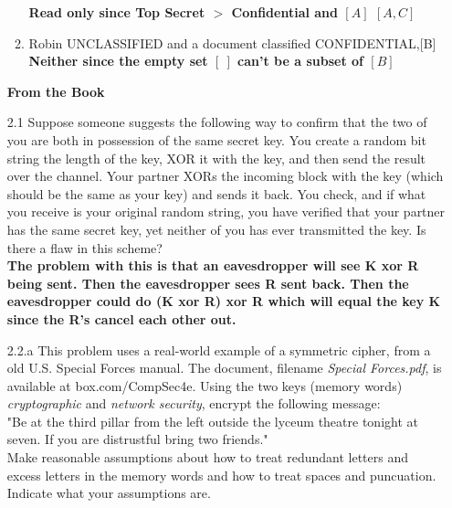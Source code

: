 \documentclass[12pt]{article}
\begin{document}
\begin{enumerate}
\begin{enumerate}
    \textbf{Read only since Top Secret $>$ Confidential and $[A]$ \subset $[A,C]$}  \\

    \item{Robin UNCLASSIFIED and a document classified CONFIDENTIAL,[B]} \\

    \textbf{Neither since the empty set $[ \ ]$ can't be a subset of $[B]$} \\

  \end{enumerate}

	\vspace{20pt}


  \textbf{From the Book}
	\item [2.1] {Suppose someone suggests the following way to confirm that the two of you are both in possession of the same secret key. You create a random bit string the length of the key, XOR it with the key, and then send the result over the channel. Your partner XORs the incoming block with the key (which should be the same as your key) and sends it back. You check, and if what you receive is your original random string, you have verified that your partner has the same secret key, yet neither of you has ever transmitted the key. Is there a flaw in this scheme?} \\

  \textbf{The problem with this is that an eavesdropper will see K xor R being sent. Then the eavesdropper sees R sent back. Then the eavesdropper could do (K xor R) xor R which will equal the key K since the R's cancel each other out.}  \\

  \item [2.2.a] {This problem uses a real-world example of a symmetric cipher, from a old U.S. Special Forces manual. The document, filename \textit{Special Forces.pdf}, is available at box.com/CompSec4e. Using the two keys (memory words) \textit{cryptographic} and \textit{network security}, encrypt the following message: } \\

   {"Be at the third pillar from the left outside the lyceum theatre tonight at seven. If you are distrustful bring two friends."} \\

   Make reasonable assumptions about how to treat redundant letters and excess letters in the memory words and how to treat spaces and puncuation. Indicate what your assumptions are.


\end{enumerate}
\end{document}
